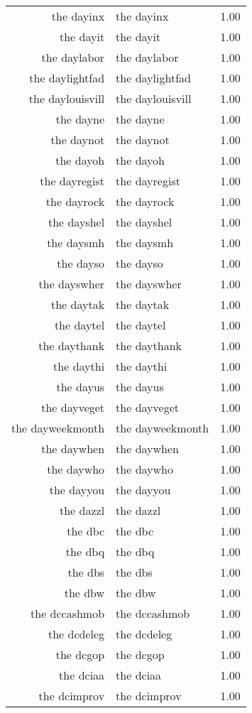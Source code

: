 \begin{table}[ht]
\begin{tabular}{rlr}
  the dayinx & the dayinx & 1.00 \\ 
  the dayit & the dayit & 1.00 \\ 
  the daylabor & the daylabor & 1.00 \\ 
  the daylightfad & the daylightfad & 1.00 \\ 
  the daylouisvill & the daylouisvill & 1.00 \\ 
  the dayne & the dayne & 1.00 \\ 
  the daynot & the daynot & 1.00 \\ 
  the dayoh & the dayoh & 1.00 \\ 
  the dayregist & the dayregist & 1.00 \\ 
  the dayrock & the dayrock & 1.00 \\ 
  the dayshel & the dayshel & 1.00 \\ 
  the daysmh & the daysmh & 1.00 \\ 
  the dayso & the dayso & 1.00 \\ 
  the dayswher & the dayswher & 1.00 \\ 
  the daytak & the daytak & 1.00 \\ 
  the daytel & the daytel & 1.00 \\ 
  the daythank & the daythank & 1.00 \\ 
  the daythi & the daythi & 1.00 \\ 
  the dayus & the dayus & 1.00 \\ 
  the dayveget & the dayveget & 1.00 \\ 
  the dayweekmonth & the dayweekmonth & 1.00 \\ 
  the daywhen & the daywhen & 1.00 \\ 
  the daywho & the daywho & 1.00 \\ 
  the dayyou & the dayyou & 1.00 \\ 
  the dazzl & the dazzl & 1.00 \\ 
  the dbc & the dbc & 1.00 \\ 
  the dbq & the dbq & 1.00 \\ 
  the dbs & the dbs & 1.00 \\ 
  the dbw & the dbw & 1.00 \\ 
  the dccashmob & the dccashmob & 1.00 \\ 
  the dcdeleg & the dcdeleg & 1.00 \\ 
  the dcgop & the dcgop & 1.00 \\ 
  the dciaa & the dciaa & 1.00 \\ 
  the dcimprov & the dcimprov & 1.00 \\ 

\end{tabular}
\end{table}

